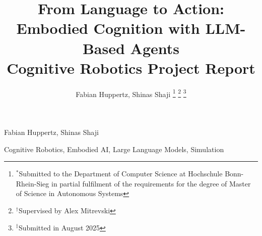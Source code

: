 \documentclass[lettersize,journal]{IEEEtran}
\begin{document}
\title{From Language to Action: Embodied Cognition with LLM-Based Agents \\ \small Cognitive Robotics Project Report}

\author{Fabian Huppertz, Shinas Shaji
	\thanks{$^*$Submitted to the Department of Computer Science at Hochschule Bonn-Rhein-Sieg in partial fulfilment of the requirements for the degree of Master of Science in Autonomous Systems}
	\thanks{$^{\dagger}$Supervised by Alex Mitrevski}
	\thanks{$^{\ddagger}$Submitted in August 2025}} %

%
{Fabian Huppertz, Shinas Shaji}

\maketitle



\begin{IEEEkeywords}
	Cognitive Robotics, Embodied AI, Large Language Models, Simulation
\end{IEEEkeywords}



% 










\end{document}
